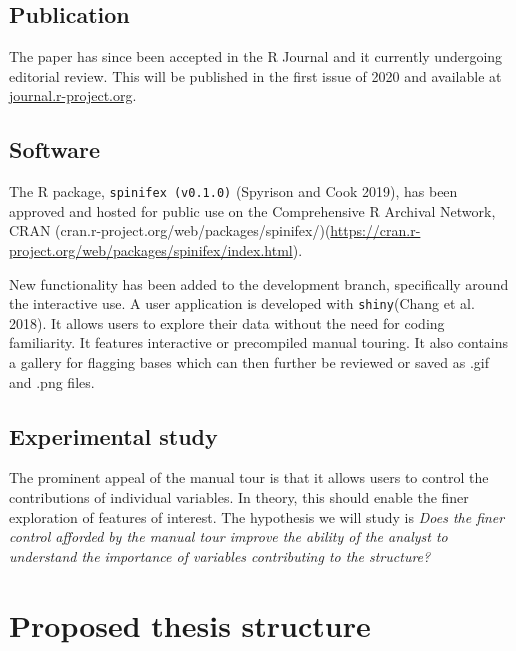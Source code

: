 \documentclass[11,]{article}
\begin{document}
\hypertarget{publication}{%
\subsection{Publication}\label{publication}}

The paper has since been accepted in the R Journal and it currently undergoing editorial review. This will be published in the first issue of 2020 and available at \href{https://journal.r-project.org/}{journal.r-project.org}.

\hypertarget{software}{%
\subsection{Software}\label{software}}

The R package, \texttt{spinifex\ (v0.1.0)} (Spyrison and Cook 2019), has been approved and hosted for public use on the Comprehensive R Archival Network, CRAN (cran.r-project.org/web/packages/spinifex/)(\url{https://cran.r-project.org/web/packages/spinifex/index.html}).

New functionality has been added to the development branch, specifically around the interactive use. A user application is developed with \texttt{shiny}(Chang et al. 2018). It allows users to explore their data without the need for coding familiarity. It features interactive or precompiled manual touring. It also contains a gallery for flagging bases which can then further be reviewed or saved as .gif and .png files.

\hypertarget{sec:expStudy}{%
\subsection{Experimental study}\label{sec:expStudy}}

The prominent appeal of the manual tour is that it allows users to control the contributions of individual variables. In theory, this should enable the finer exploration of features of interest. The hypothesis we will study is \emph{Does the finer control afforded} \emph{by the manual tour improve the ability of the analyst to understand the}
\emph{importance of variables contributing to the structure?}

\hypertarget{proposed-thesis-structure}{%
\section{Proposed thesis structure}\label{proposed-thesis-structure}}
\end{document}
